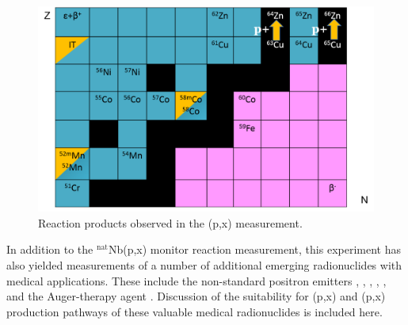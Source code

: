 \begin{figure}
 \centering
 \includegraphics[width=0.75\columnwidth]{./figures/ipf_cu_product_table.png}
 \caption{Reaction products observed in the (p,x) measurement.}
 \label{fig:fe_cu_product_table}
\end{figure}






In addition to the $^\text{nat}$Nb(p,x) monitor reaction measurement, this experiment has also yielded measurements of  a number of additional  emerging radionuclides with medical applications.
These include the non-standard positron emitters 
 \cite{PMID:7632762,zweit1996medium,Graves2016,Rosch2014}, 
 \cite{Lewis2003,Bandari2014,mp500671j,Szelecsenyi1993,Aslam2009,Hilgers2003,Szelecsenyi2005,Voyles2017},   \cite{Valdovinos2017,Nickles2003,Qaim2008,QaimSyedM2011,Rosch1993,doi:10.1139/v67-193,levkovski1991cross,Johnson2015,Singh2013,Kiselev1974,Kandil2009}, 
  \cite{Verel2003,Dijkers2009,Dijkers2010,PhysRevC.38.1624,Omara2009},  
 \cite{Busse2002,Radchenko2012},  
and the Auger-therapy agent  \cite{Kovacs1991,Titarenko2011}. 
Discussion of the suitability for  (p,x) and (p,x) production pathways of these valuable medical radionuclides is included here. 


%
%

